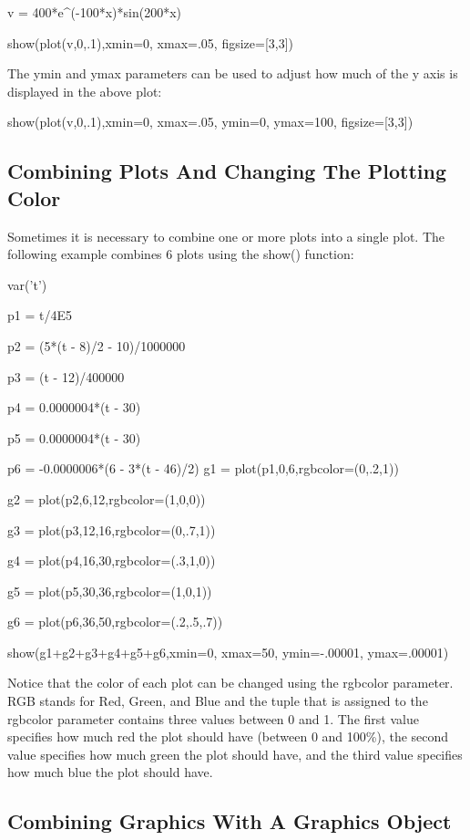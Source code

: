 \documentclass[12pt,oneside]{book}
\begin{document}
v = 400*e\^{}({}-100*x)*sin(200*x)

show(plot(v,0,.1),xmin=0, xmax=.05, figsize=[3,3])

{\textbar}


The ymin and ymax parameters can be used to adjust how much of the y axis is displayed in the above plot: 

show(plot(v,0,.1),xmin=0, xmax=.05, ymin=0, ymax=100, figsize=[3,3])

{\textbar}


\subsection[Combining Plots And Changing The Plotting Color]{Combining Plots And Changing The Plotting Color}

Sometimes it is necessary to combine one or more plots into a single plot. The following example combines 6 plots using the show() function: 

var('t')

p1 = t/4E5

p2 = (5*(t {}- 8)/2 {}- 10)/1000000

p3 = (t {}- 12)/400000

p4 = 0.0000004*(t {}- 30)

p5 = 0.0000004*(t {}- 30)

p6 = {}-0.0000006*(6 {}- 3*(t {}- 46)/2)
g1 = plot(p1,0,6,rgbcolor=(0,.2,1))

g2 = plot(p2,6,12,rgbcolor=(1,0,0))

g3 = plot(p3,12,16,rgbcolor=(0,.7,1))

g4 = plot(p4,16,30,rgbcolor=(.3,1,0))

g5 = plot(p5,30,36,rgbcolor=(1,0,1))

g6 = plot(p6,36,50,rgbcolor=(.2,.5,.7))


show(g1+g2+g3+g4+g5+g6,xmin=0, xmax=50, ymin={}-.00001, ymax=.00001)

{\textbar}


Notice that the color of each plot can be changed using the rgbcolor parameter. RGB stands for Red, Green, and Blue and the tuple that is assigned to the rgbcolor parameter contains three values between 0 and 1. The first value specifies how much red the plot should have (between 0 and 100\%), the second value specifies how much green the plot should have, and the third value specifies how much blue the plot should have.

\subsection[Combining Graphics With A Graphics Object]{Combining Graphics With A Graphics Object}
\end{document}
